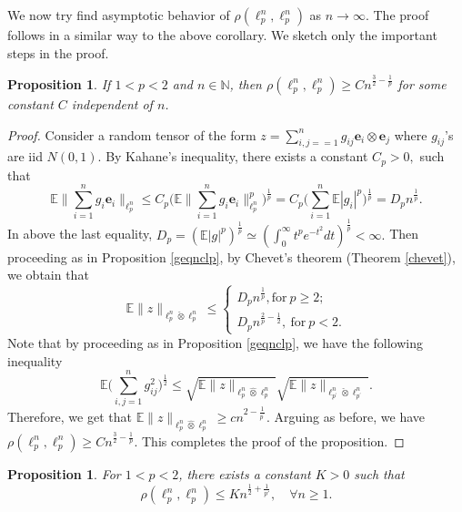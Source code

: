 \documentclass[a4paper,oneside,11pt, reqno]{amsart}
\numberwithin{equation}{section}
\newtheorem{proposition}[theorem]{Proposition}
\theoremstyle{plain}
\begin{document}
 We now try find asymptotic behavior of $\rho(\ell_p^n,\ell_p^n)$ as $n\to\infty.$ The proof follows in a similar way to the above corollary. We sketch only the important steps in the proof.
 \begin{proposition}%
      If $1< p<2$ and $n\in\mathbb{N}$, then $\rho(\ell_p^{n},\ell_p^{n})\geqslant Cn^{\frac{3}{2}-\frac{1}{p}}$ for some constant $C$ independent of $n$.
 \end{proposition}
 \begin{proof}
     Consider a random tensor of the form $z=\sum_{i,j==1}^{n}g_{ij}\mathbf{e}_i\otimes\mathbf{e}_j$ where $g_{ij}$'s are iid $N(0,1).$ 
     By Kahane's inequality, there exists a constant $C_p>0,$ such that
     \[\mathbb{E}\Big\|\sum_{i=1}^{n}g_i\mathbf{e}_i\Big\|_{\ell_p^{n}}\leqslant C_p\Big(\mathbb{E}\Big\|\sum_{i=1}^{n}g_i\mathbf{e}_i\Big\|_{\ell_p^{n}}^p\Big)^{\frac{1}{p}}=C_p\Big(\sum_{i=1}^{n}\mathbb{E}|g_i|^p\Big)^{\frac{1}{p}}=D_pn^\frac{1}{p}.\] 
     In above the last equality, $D_p=(\mathbb{E}|g|^p)^{\frac{1}{p}}\simeq (\int_{0}^\infty t^pe^{-t^2}dt)^{\frac{1}{p}}<\infty.$
Then proceeding as in Proposition \ref{geqnclp}, by Chevet's theorem (Theorem \ref{chevet}), we obtain that 
    \[\mathbb{E}\|z\|_{\ell_p^{n}\check{\otimes}\ell_p^{n}}\leqslant \begin{cases}
                        D_p n^{\frac{1}{p}} , \text{for}\ p\geqslant 2; \\
                        D_p n^{\frac{2}{p}-\frac{1}{2}}, \ \text{for}\ p<2.
                    \end{cases}\]
     Note that by proceeding as in Proposition \ref{geqnclp}, we have the following inequality
     \[\mathbb{E}\Big(\sum_{i,j=1}^ng_{ij}^2\Big)^{\frac{1}{2}}\leqslant \sqrt{\mathbb{E}\|z\|_{\ell_p^{n}\hat{\otimes}\ell_p^{n}}}\sqrt{\mathbb{E}\|z\|_{\ell_{p^\prime}^{n}\check{\otimes}\ell_{p^\prime}^{n}}}.\] 
     Therefore, we get that $\mathbb E\|z\|_{\ell_p^{n}\hat{\otimes} \ell_p^{n}}\geqslant cn^{{2}-\frac{1}{p^\prime}}.$ Arguing as before, we have $\rho(\ell_p^{n},\ell_p^{n})\geqslant Cn^{\frac{3}{2}-\frac{1}{p}}.$
     This completes the proof of the proposition.
 \end{proof}
  \begin{proposition}%
     For $1<p < 2$, there exists a constant $K>0$ such that
     $$\rho(\ell_p^{n},\ell_p^{n})\leqslant Kn^{\frac{1}{2}+\frac{1}{p'}}, \quad \forall n\geqslant 1.$$ 
 \end{proposition}
\end{document}
